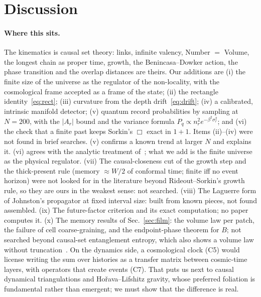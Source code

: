 \documentclass[11pt,a4paper]{article}
\newcommand{\tagbox}[2]{\textsf{\scriptsize\colorbox{#1!12}{\textcolor{#1!70!black}{#2}}}}
\newcommand{\ours}{\tagbox{orange}{ours}}
\begin{document}
\section{Discussion}
\paragraph{Where this sits.} The kinematics is causal set theory: links, infinite valency, Number $=$ Volume, the longest chain as proper time, growth, the Benincasa--Dowker action, the phase transition and the overlap distances are theirs. Our additions are (i) the finite size of the universe as the regulator of the non-locality, with the cosmological frame accepted as a frame of the state; (ii) the rectangle identity~\eqref{eq:rect}; (iii) curvature from the depth drift~\eqref{eq:drift}; (iv) a calibrated, intrinsic manifold detector; (v) quantum record probabilities by sampling at $N=200$, with the $|A_r|$ bound and the variance formula $P_q\propto n_r^2e^{-\beta^2\sigma_r^2}$; and (vi) the check that a finite past keeps Sorkin's $\Box$ exact in $1+1$. Items (ii)--(iv) were not found in brief searches. (v) confirms a known trend at larger $N$ and explains it. (vi) agrees with the analytic treatment of~\cite{ASS14}; what we add is the finite universe as the physical regulator. (vii) The causal-closeness cut of the growth step and the thick-present rule (memory $\approx W/2$ of conformal time; finite iff no event horizon) were not looked for in the literature beyond Rideout--Sorkin's growth rule, so they are \ours{} in the weakest sense: not searched. (viii) The Laguerre form of Johnston's propagator at fixed interval size: built from known pieces, not found assembled. (ix) The future-factor criterion and its exact computation; no paper computes it. (x) The memory results of Sec.~\ref{sec:film}: the volume law per patch, the failure of cell coarse-graining, and the endpoint-phase theorem for $B$; not searched beyond causal-set entanglement entropy, which also shows a volume law without truncation~\cite{SorkinYazdi18}. On the dynamics side, a cosmological clock (C5) would license writing the sum over histories as a transfer matrix between cosmic-time layers, with operators that create events (C7). That puts us next to causal dynamical triangulations and Hořava--Lifshitz gravity, whose preferred foliation is fundamental rather than emergent; we must show that the difference is real.
\end{document}
